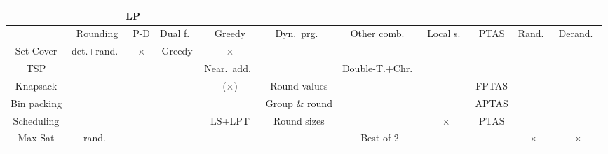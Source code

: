 \documentclass{article}
\newcommand{\x}{\ensuremath{\times}}
\begin{document}
\begin{landscape}
\hspace*{-3cm}
\begin{tabular}{|c||c|c|c|c|c|c|c|c|c|c|}
  \hline
             & \multicolumn{3}{|c|}{LP}       &              &                &                    &           &       &        & \\
  \hline
             & Rounding    & P-D   & Dual f.\ & Greedy       & Dyn.\ prg.\    & Other comb.\       & Local s.\ & PTAS  & Rand.\ & Derand.\ \\
  \hline\hline
  Set Cover  & det.+rand.\ & \x    & Greedy   & \x           &                &                    &           &       &        & \\
  \hline
  TSP        &             &       &          & Near.\ add.\ &                & Double-T.+Chr.\    &           &       &        &\\
  \hline
  Knapsack   &             &       &          & (\x)         & Round values   &                    &           & FPTAS &        &\\
  \hline
Bin packing  &             &       &          &              & Group \& round &                    &           & APTAS &        &\\
\hline
 Scheduling  &             &       &          & LS+LPT       & Round sizes    &                    & \x        & PTAS  &        &\\
  \hline
  Max Sat    & rand.\      &       &          &              &                & Best-of-2          &           &       & \x     & \x\\
  \hline
\end{tabular}
\end{landscape}
\end{document}
